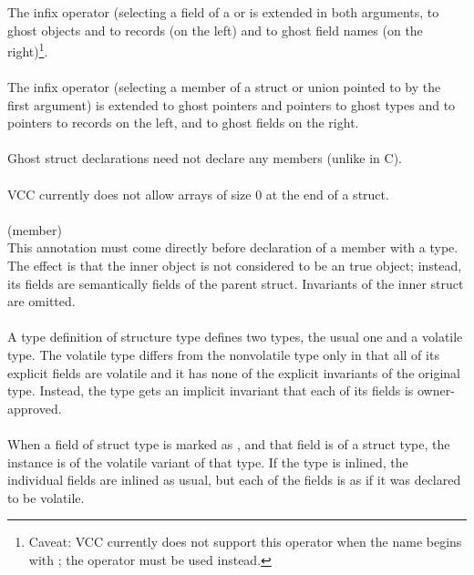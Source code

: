 \documentclass[preprint,nocopyrightspace]{sigplanconf}
\begin{document}
{{{The infix  operator (selecting a field of a 
or  is extended in both arguments, to ghost objects and to
records (on the left) and to ghost field names (on the right)\footnote{
Caveat: VCC currently does not support this operator when the name begins
with \vcc{\ }; the \vcc{->} operator must be used instead.}.
\\\\
The infix \vcc{->} operator (selecting a member of a struct or union
pointed to by the first argument) is extended to ghost pointers and
pointers to ghost types and to pointers to records on the left, and to
ghost fields on the right.
\\\\
Ghost struct declarations need not declare any members (unlike in C).
\\\\
VCC currently does not allow arrays of size 0 at the end of a struct.
\\\\
 (member)\\
This annotation must come directly before declaration of a member with
a  type. The effect is that the inner object is not considered to be an
true object; instead, its fields are semantically fields of the
parent struct. Invariants of the inner struct are omitted.
\\\\
A type definition of structure type defines two types, the usual one
and a volatile type. The volatile type differs from the nonvolatile
type only in that all of its explicit fields are volatile and it has
none of the explicit invariants of the original type. Instead, the
type gets an implicit invariant that each of its fields is
owner-approved. 
\\\\
When a field of struct type is marked as , and that
field is of a struct type, the instance is of the volatile variant of
that type. If the type is inlined, the individual fields are inlined
as usual, but each of the fields is as if it was declared to be
volatile. 

}}}
\end{document}
